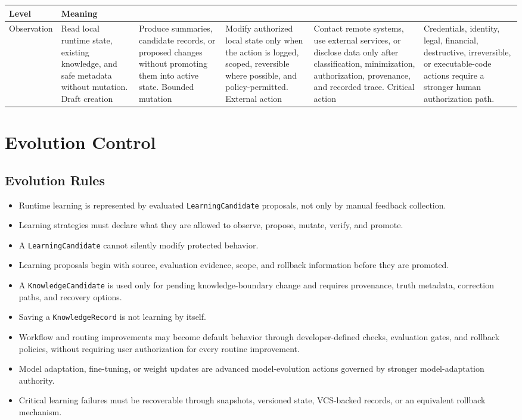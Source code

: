 \documentclass[11pt]{report}
\begin{document}
\begin{tabularx}{.95\linewidth}{@{}lX@{}}
	\toprule
	\textbf{Level} & \textbf{Meaning} \\
	\midrule
	Observation & Read local runtime state, existing knowledge, and safe metadata without mutation. \n
	Draft creation & Produce summaries, candidate records, or proposed changes without promoting them into active state. \n
	Bounded mutation & Modify authorized local state only when the action is logged, scoped, reversible where possible, and policy-permitted. \n
	External action & Contact remote systems, use external services, or disclose data only after classification, minimization, authorization, provenance, and recorded trace. \n
	Critical action & Credentials, identity, legal, financial, destructive, irreversible, or executable-code actions require a stronger human authorization path. \\
	\bottomrule
\end{tabularx}

\section{Evolution Control}

\subsection{Evolution Rules}

\begin{itemize}
	\item Runtime learning is represented by evaluated \texttt{LearningCandidate} proposals, not only by manual feedback collection.
	\item Learning strategies must declare what they are allowed to observe, propose, mutate, verify, and promote.
	\item A \texttt{LearningCandidate} cannot silently modify protected behavior.
	\item Learning proposals begin with source, evaluation evidence, scope, and rollback information before they are promoted.
	\item A \texttt{KnowledgeCandidate} is used only for pending knowledge-boundary change and requires provenance, truth metadata, correction paths, and recovery options.
	\item Saving a \texttt{KnowledgeRecord} is not learning by itself.
	\item Workflow and routing improvements may become default behavior through developer-defined checks, evaluation gates, and rollback policies, without requiring user authorization for every routine improvement.
	\item Model adaptation, fine-tuning, or weight updates are advanced model-evolution actions governed by stronger model-adaptation authority.
	\item Critical learning failures must be recoverable through snapshots, versioned state, VCS-backed records, or an equivalent rollback mechanism.
\end{itemize}
\end{document}
